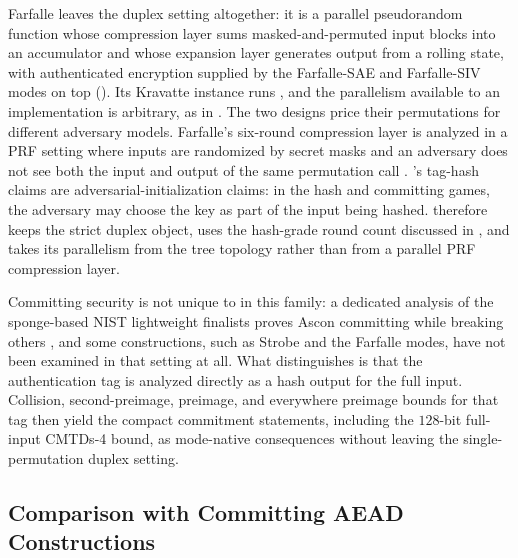 Farfalle \cite{BDHPVV17} leaves the duplex setting altogether: it is a
parallel pseudorandom function whose compression layer sums
masked-and-permuted input blocks into an accumulator and whose expansion
layer generates output from a rolling state, with authenticated encryption
supplied by the Farfalle-SAE and Farfalle-SIV modes on top
(). Its Kravatte instance runs \Keccak[1600, 6], and the
parallelism available to an implementation is arbitrary, as in \TW{}. The two
designs price their permutations for different adversary models. Farfalle's
six-round compression layer is analyzed in a PRF setting where inputs are
randomized by secret masks and an adversary does not see both the input and
output of the same permutation call \cite{BDHPVV17}. \TW{}'s tag-hash claims
are adversarial-initialization claims: in the hash and committing games, the
adversary may choose the key as part of the input being hashed. \TW{} therefore
keeps the strict duplex object, uses the hash-grade round count discussed in
, and takes its parallelism from the tree
topology rather than from a parallel PRF compression layer.

Committing security is not unique to \TW{} in this family: a dedicated analysis
of the sponge-based NIST lightweight finalists proves Ascon committing while
breaking others \cite{KSW23}, and some constructions, such as Strobe and the
Farfalle modes, have not been examined in that setting at all. What
distinguishes \TW{} is that the authentication tag is analyzed directly as a
hash output for the full input. Collision, second-preimage, preimage, and
everywhere preimage bounds for that tag then yield the compact commitment
statements, including the $128$-bit full-input \textsf{CMTDs-4} bound, as
mode-native consequences without leaving the single-permutation duplex setting.

\subsection{Comparison with Committing AEAD Constructions}
\label{sec:compare-commit}

